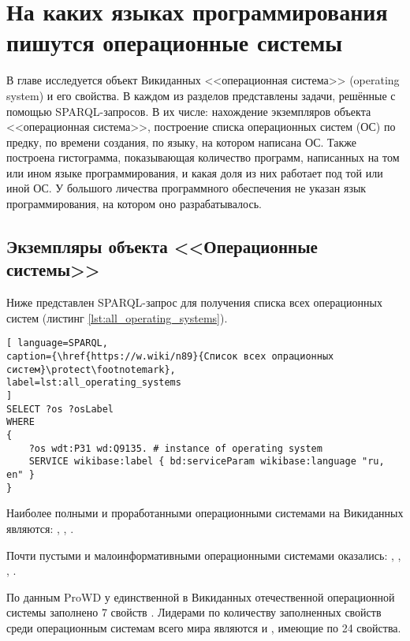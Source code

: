 \chapter{На каких языках программирования пишутся операционные системы}
\label{ch:operating-sysmets}

В главе исследуется объект Викиданных <<операционная система>> (operating system) и его свойства. В каждом из разделов представлены задачи, решённые с помощью SPARQL-запросов. В их числе: нахождение экземпляров объекта <<операционная система>>, построение списка операционных систем (ОС) по предку, по времени создания, по языку, на котором написана ОС. Также построена гистограмма, показывающая количество программ, написанных на том или ином языке программирования, и какая доля из них работает под той или иной ОС. У большого личества программного обеспечения не указан язык программирования, на котором оно разрабатывалось.


\section{Экземпляры объекта <<Операционные системы>>}
Ниже представлен SPARQL-запрос для получения списка всех операционных систем (листинг \ref{lst:all_operating_systems}).

\begin{lstlisting}[ language=SPARQL, 
caption={\href{https://w.wiki/n89}{Список всех опрационных систем}\protect\footnotemark},
label=lst:all_operating_systems
]
SELECT ?os ?osLabel
WHERE
{
	?os wdt:P31 wd:Q9135. # instance of operating system
	SERVICE wikibase:label { bd:serviceParam wikibase:language "ru, en" }
}
\end{lstlisting}

Наиболее полными и проработанными операционными системами на Викиданных являются: , , .

Почти пустыми и малоинформативными операционными системами оказались: , , , .

По данным ProWD у единственной в Викиданных отечественной операционной системы  заполнено 7 свойств \cite{prowd_os_link}. Лидерами по количеству заполненных свойств среди операционным системам всего мира являются  и , имеющие по 24 свойства.


